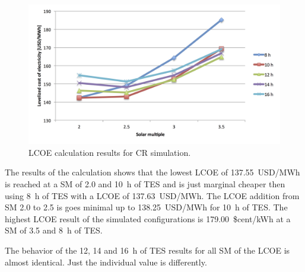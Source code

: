 \begin{figure}[htbp]  
\centering
\includegraphics[width=1\linewidth]{FIG/CR_LCOE}
\caption[LCOE calculation results for CR simulation.]{LCOE calculation results for CR simulation.}\label{CR_LCOE}
\end{figure}
The results of the calculation shows that the lowest LCOE of \SI{137.55}{USD/MWh} is reached at a SM of 2.0 and \SI{10}{h} of TES and is just  marginal cheaper then using \SI{8}{h} of TES with a LCOE of \SI{137.63}{USD/MWh}. The LCOE addition from SM 2.0 to 2.5 is goes minimal up to \SI{138.25}{USD/MWh} for \SI{10}{h} of TES. The highest LCOE result of the simulated configurations is 179.00~\$cent/kWh at a SM of 3.5 and \SI{8}{h} of TES. 

The behavior of the 12, 14 and \SI{16}{h} of TES results for all SM of the LCOE is almost identical. Just the individual value is differently.

